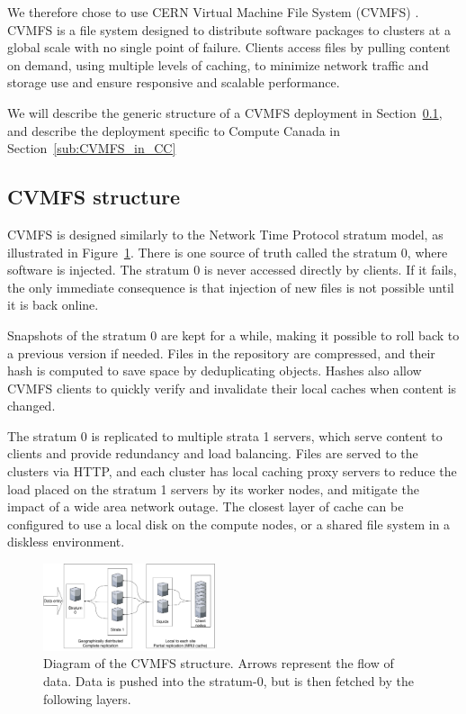 \documentclass[sigconf]{acmart}
\begin{document}
We therefore chose to use CERN Virtual Machine File System (CVMFS) \cite{CVMFS}. CVMFS is a file system designed to distribute software packages to clusters at a global scale with no single point of failure. Clients access files by pulling content on demand, using multiple levels of caching, to minimize network traffic and storage use and ensure responsive and scalable performance.

We will describe the generic structure of a CVMFS deployment in Section~\ref{sub:CVMFS_structure}, and describe the deployment specific to Compute Canada in Section~\ref{sub:CVMFS_in_CC}

\subsection{CVMFS structure}
\label{sub:CVMFS_structure}
CVMFS is designed similarly to the Network Time Protocol stratum model, as illustrated in Figure~\ref{fig:CVMFS_structure}. There is one source of truth called the stratum 0, where software is injected.  The stratum 0 is never accessed directly by clients. If it fails, the only immediate consequence is that injection of new files is not possible until it is back online. 

Snapshots of the stratum 0 are kept for a while, making it possible to roll back to a previous version if needed. Files in the repository are compressed, and their hash is computed to save space by deduplicating objects. Hashes also allow CVMFS clients to quickly verify and invalidate their local caches when content is changed.

The stratum 0 is replicated to multiple strata 1 servers, which serve content to clients and provide redundancy and load balancing. Files are served to the clusters via HTTP, and each cluster has local caching proxy servers to reduce the load placed on the stratum 1 servers by its worker nodes, and mitigate the impact of a wide area network outage. The closest layer of cache can be configured to use a local disk on the compute nodes, or a shared file system in a diskless environment.

\begin{figure}
  \includegraphics[width=0.45\textwidth]{CVMFS-structure.pdf}
  \caption{Diagram of the CVMFS structure. Arrows represent the flow of data. Data is pushed into the stratum-0, but is then fetched by the following layers.}
  \label{fig:CVMFS_structure}
\end{figure}
\end{document}
